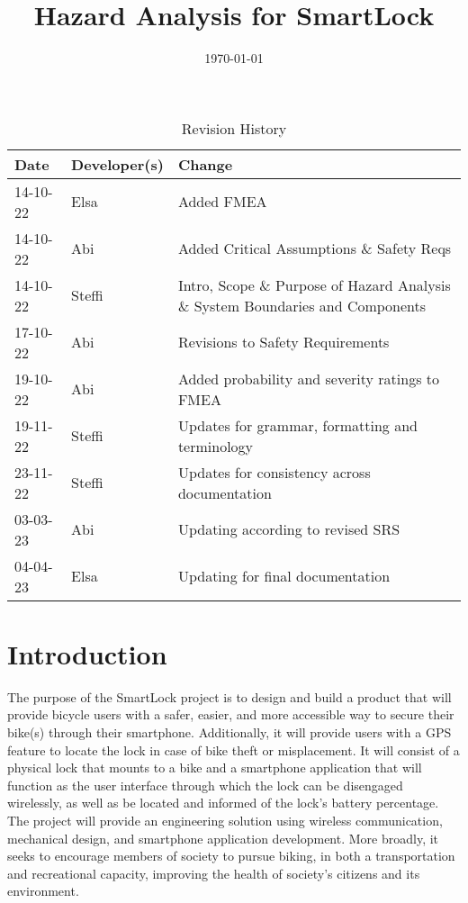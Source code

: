 \documentclass{article}
\title{Hazard Analysis for SmartLock\\\progname}
\author{\authname}
\date{\today}
\begin{document}
\maketitle
\thispagestyle{empty}

\newpage
{}

\begin{table}[hp]
\caption{Revision History} \label{TblRevisionHistory}
\begin{tabularx}{\textwidth}{llX}
\toprule
\textbf{Date} & \textbf{Developer(s)} & \textbf{Change}\\
\midrule
14-10-22 & Elsa & Added FMEA\\
14-10-22 & Abi & Added Critical Assumptions \& Safety Reqs\\
14-10-22 & Steffi & Intro, Scope \& Purpose of Hazard Analysis \& System Boundaries and Components\\
17-10-22 & Abi & Revisions to Safety Requirements\\
19-10-22 & Abi & Added probability and severity ratings to FMEA \\
19-11-22 & Steffi & Updates for grammar, formatting and terminology\\
23-11-22 & Steffi & Updates for consistency across documentation\\
03-03-23 & Abi & Updating according to revised SRS\\
04-04-23 & Elsa & Updating for final documentation\\
\bottomrule
\end{tabularx}
\end{table}

\newpage


\tableofcontents

\listoftables

\listoffigures

\newpage


\section{Introduction}
The purpose of the SmartLock project is to design and build a product that will provide bicycle users with a safer, easier, and more accessible way to secure their bike(s) through their smartphone. Additionally, it will provide users with a GPS feature to locate the lock in case of bike theft or misplacement.  It will consist of a physical lock that mounts to a bike and a smartphone application that will function as the user interface through which the lock can be disengaged wirelessly, as well as be located and informed of the lock's battery percentage. The project will provide an engineering solution using wireless communication, mechanical design, and smartphone application development. More broadly, it seeks to encourage members of society to pursue biking, in both a transportation and recreational capacity, improving the health of society’s citizens and its environment.  
\end{document}
